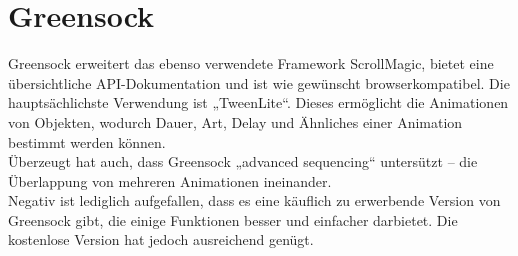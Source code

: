 \section{Greensock}
Greensock erweitert das ebenso verwendete Framework ScrollMagic, bietet eine übersichtliche API-Dokumentation und ist wie gewünscht browserkompatibel. Die hauptsächlichste Verwendung ist „TweenLite“. Dieses ermöglicht die Animationen von Objekten, wodurch Dauer, Art, Delay und Ähnliches einer Animation bestimmt werden können. \\
Überzeugt hat auch, dass Greensock „advanced sequencing“ untersützt – die Überlappung von mehreren Animationen ineinander. \\
Negativ ist lediglich aufgefallen, dass es eine käuflich zu erwerbende Version von Greensock gibt, die einige Funktionen besser und einfacher darbietet. Die kostenlose Version hat jedoch ausreichend genügt.